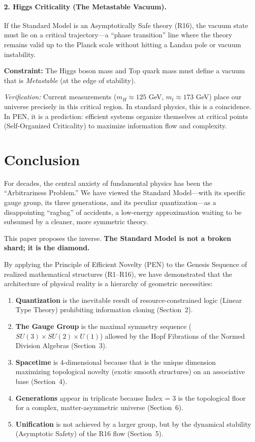 \documentclass[12pt,a4paper]{article}
\theoremstyle{definition}
\newcommand{\SM}{SU(3) \times SU(2) \times U(1)}
\begin{document}
\paragraph{2. Higgs Criticality (The Metastable Vacuum).}
If the Standard Model is an Asymptotically Safe theory (R16), the vacuum state must lie on a critical trajectory—a ``phase transition'' line where the theory remains valid up to the Planck scale without hitting a Landau pole or vacuum instability.

\textbf{Constraint:} The Higgs boson mass and Top quark mass must define a vacuum that is \emph{Metastable} (at the edge of stability).

\emph{Verification:} Current measurements ($m_H \approx 125$ GeV, $m_t \approx 173$ GeV) place our universe precisely in this critical region. In standard physics, this is a coincidence. In PEN, it is a prediction: efficient systems organize themselves at critical points (Self-Organized Criticality) to maximize information flow and complexity.

\section{Conclusion}

For decades, the central anxiety of fundamental physics has been the ``Arbitrariness Problem.'' We have viewed the Standard Model—with its specific gauge group, its three generations, and its peculiar quantization—as a disappointing ``ragbag'' of accidents, a low-energy approximation waiting to be subsumed by a cleaner, more symmetric theory.

This paper proposes the inverse. \textbf{The Standard Model is not a broken shard; it is the diamond.}

By applying the Principle of Efficient Novelty (PEN) to the Genesis Sequence of realized mathematical structures (R1--R16), we have demonstrated that the architecture of physical reality is a hierarchy of geometric necessities:

\begin{enumerate}[leftmargin=2em]
    \item \textbf{Quantization} is the inevitable result of resource-constrained logic (Linear Type Theory) prohibiting information cloning (Section~2).
    \item \textbf{The Gauge Group} is the maximal symmetry sequence ($\SM$) allowed by the Hopf Fibrations of the Normed Division Algebras (Section~3).
    \item \textbf{Spacetime} is 4-dimensional because that is the unique dimension maximizing topological novelty (exotic smooth structures) on an associative base (Section~4).
    \item \textbf{Generations} appear in triplicate because Index = 3 is the topological floor for a complex, matter-asymmetric universe (Section~6).
    \item \textbf{Unification} is not achieved by a larger group, but by the dynamical stability (Asymptotic Safety) of the R16 flow (Section~5).
\end{enumerate}
\end{document}
